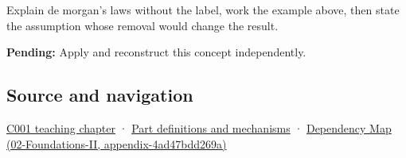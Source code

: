 Explain de morgan's laws without the label, work the example above, then state the assumption whose removal would change the result.

\textbf{Pending:} Apply and reconstruct this concept independently.

\subsection{Source and navigation}\label{source-and-navigation}

\href{Continuous\%20Notes/Computing\%20Foundations\%20-\%20From\%20Bits\%20to\%20C++\%20and\%20Systems\%20APIs\#From\%20a\%20signal\%20to\%20an\%20interpretation}{C001 teaching chapter} · \hyperref[appendix-fd090d982a15]{Part definitions and mechanisms} · \href{}{Dependency Map (02-Foundations-II, appendix-4ad47bdd269a)}
